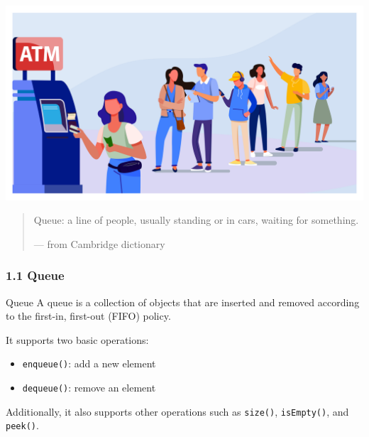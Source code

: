 \documentclass[aspectratio=169, 14pt]{beamer}
\begin{document}
\begin{frame}

	\begin{center}
		\includegraphics[height=.5\paperheight]{week4/atm}
	\end{center}
	\begin{quote}
		Queue: a line of people, usually standing or in cars, waiting for something.
		\begin{flushright}
			--- from Cambridge dictionary
		\end{flushright}
	\end{quote}
\end{frame}

\begin{frame}
	\frametitle{1.1 Queue}

	\begin{exampleblock}{Queue}
		A queue is a collection of objects that are inserted and removed according to the
		\alert{first-in, first-out (FIFO)} policy.
	\end{exampleblock}

	It supports two basic operations:
	\begin{itemize}
		\item \texttt{enqueue()}: add a new element
		\item \texttt{dequeue()}: remove an element
	\end{itemize}
	Additionally, it also supports other operations such as \texttt{size()}, \texttt{isEmpty()}, and \texttt{peek()}.
\end{frame}
\end{document}
